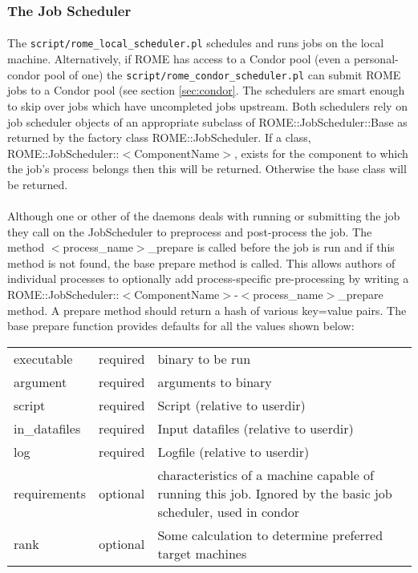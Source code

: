 \subsubsection{The Job Scheduler}
\label{sec:job_scheduling}

\paragraph{}
The \texttt{script/rome\_local\_scheduler.pl} schedules and runs jobs on the local machine. Alternatively, if ROME has access to a Condor pool (even a personal-condor pool of one) the \texttt{script/rome\_condor\_scheduler.pl} can submit ROME jobs to a Condor pool (see section \ref{sec:condor}. The schedulers are smart enough to skip over jobs which have uncompleted jobs upstream. Both schedulers rely on job scheduler objects of an appropriate subclass of ROME::JobScheduler::Base as returned by the factory class ROME::JobScheduler. If a class, ROME::JobScheduler::$<$ComponentName$>$, exists for the component to which the job's process belongs then this will be returned. Otherwise the base class will be returned. 

\paragraph{}
Although one or other of the daemons deals with running or submitting the job they call on the JobScheduler to preprocess and post-process the job. The method $<$process\_name$>$\_prepare is called before the job is run and if this method is not found, the base prepare method is called. This allows authors of individual processes to optionally add process-specific pre-processing by writing a ROME::JobScheduler::$<$ComponentName$>$-$<$process\_name$>$\_prepare method. A prepare method should return a hash of various key=value pairs. The base prepare function provides defaults for all the values shown below:

\begin{scriptsize}
\begin{tabular}{l|c|l}
executable & required & binary to be run \\
argument&required&arguments to binary\\
script&required&Script (relative to userdir)\\
in\_datafiles&required&Input datafiles (relative to userdir)\\
log&required&Logfile (relative to userdir)\\
requirements&optional&characteristics of a machine capable of running this job. Ignored by the basic job scheduler, used in condor\\
rank&optional&Some calculation to determine preferred target machines \\
\end{tabular}
\end{scriptsize}


